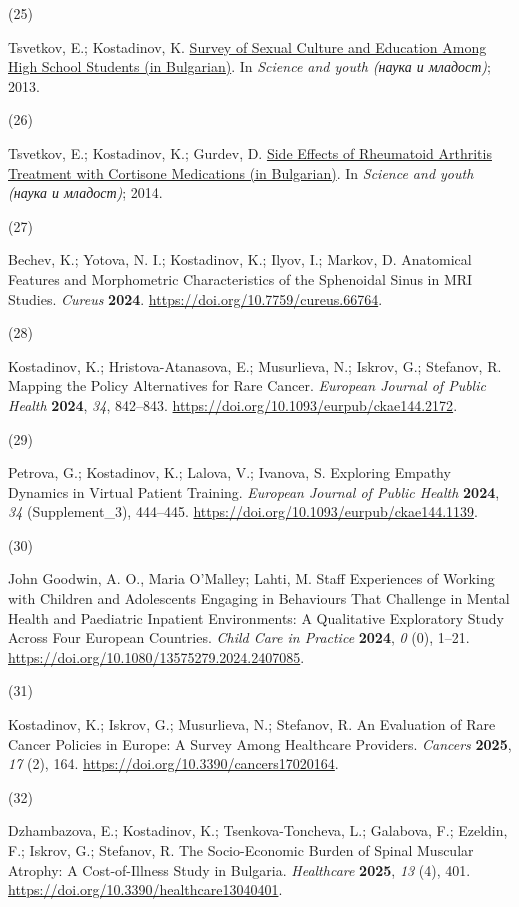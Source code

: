 \documentclass[
  12pt,
  letterpaper,
  DIV=11,
  numbers=noendperiod]{scrartcl}
\newlength{\cslhangindent}
\newlength{\csllabelwidth}
\newenvironment{CSLReferences}[2] %
 {\begin{list}{}{%
  \setlength{\itemindent}{0pt}
  \setlength{\leftmargin}{0pt}
  \setlength{\parsep}{0pt}
  \ifodd #1
   \setlength{\leftmargin}{\cslhangindent}
   \setlength{\itemindent}{-1\cslhangindent}
  \fi
  \setlength{\itemsep}{#2\baselineskip}}}
 {\end{list}}
\newcommand{\CSLLeftMargin}[1]{\parbox[t]{\csllabelwidth}{\strut#1\strut}}
\newcommand{\CSLRightInline}[1]{\parbox[t]{\linewidth - \csllabelwidth}{\strut#1\strut}}
\begin{document}
\begin{CSLReferences}{0}{0}
\CSLLeftMargin{(25) }%
\CSLRightInline{Tsvetkov, E.; Kostadinov, K.
\href{https://asclepius.bg/cnm/wp-content/uploads/2022/05/mnd_2013.pdf}{Survey
of Sexual Culture and Education Among High School Students (in
Bulgarian)}. In \emph{Science and youth (наука и младост)}; 2013.}

\CSLLeftMargin{(26) }%
\CSLRightInline{Tsvetkov, E.; Kostadinov, K.; Gurdev, D.
\href{https://asclepius.bg/cnm/wp-content/uploads/2022/05/sbornik-2014.pdf}{Side
Effects of Rheumatoid Arthritis Treatment with Cortisone Medications (in
Bulgarian)}. In \emph{Science and youth (наука и младост)}; 2014.}

\CSLLeftMargin{(27) }%
\CSLRightInline{Bechev, K.; Yotova, N. I.; Kostadinov, K.; Ilyov, I.;
Markov, D. Anatomical Features and Morphometric Characteristics of the
Sphenoidal Sinus in MRI Studies. \emph{Cureus} \textbf{2024}.
\url{https://doi.org/10.7759/cureus.66764}.}

\CSLLeftMargin{(28) }%
\CSLRightInline{Kostadinov, K.; Hristova-Atanasova, E.; Musurlieva, N.;
Iskrov, G.; Stefanov, R. Mapping the Policy Alternatives for Rare
Cancer. \emph{European Journal of Public Health} \textbf{2024},
\emph{34}, 842--843. \url{https://doi.org/10.1093/eurpub/ckae144.2172}.}

\CSLLeftMargin{(29) }%
\CSLRightInline{Petrova, G.; Kostadinov, K.; Lalova, V.; Ivanova, S.
Exploring Empathy Dynamics in Virtual Patient Training. \emph{European
Journal of Public Health} \textbf{2024}, \emph{34} (Supplement\_3),
444--445. \url{https://doi.org/10.1093/eurpub/ckae144.1139}.}

\CSLLeftMargin{(30) }%
\CSLRightInline{John Goodwin, A. O., Maria O'Malley; Lahti, M. Staff
Experiences of Working with Children and Adolescents Engaging in
Behaviours That Challenge in Mental Health and Paediatric Inpatient
Environments: A Qualitative Exploratory Study Across Four European
Countries. \emph{Child Care in Practice} \textbf{2024}, \emph{0} (0),
1--21. \url{https://doi.org/10.1080/13575279.2024.2407085}.}

\CSLLeftMargin{(31) }%
\CSLRightInline{Kostadinov, K.; Iskrov, G.; Musurlieva, N.; Stefanov, R.
An Evaluation of Rare Cancer Policies in Europe: A Survey Among
Healthcare Providers. \emph{Cancers} \textbf{2025}, \emph{17} (2), 164.
\url{https://doi.org/10.3390/cancers17020164}.}

\CSLLeftMargin{(32) }%
\CSLRightInline{Dzhambazova, E.; Kostadinov, K.; Tsenkova-Toncheva, L.;
Galabova, F.; Ezeldin, F.; Iskrov, G.; Stefanov, R. The Socio-Economic
Burden of Spinal Muscular Atrophy: A Cost-of-Illness Study in Bulgaria.
\emph{Healthcare} \textbf{2025}, \emph{13} (4), 401.
\url{https://doi.org/10.3390/healthcare13040401}.}

\end{CSLReferences}
\end{document}

